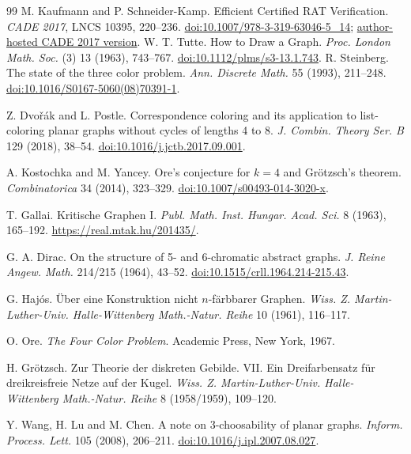 \documentclass[11pt]{article}
\begin{document}
\begin{thebibliography}{99}
M. Kaufmann and P. Schneider-Kamp.
Efficient Certified RAT Verification.
\emph{CADE 2017}, LNCS 10395, 220--236.
\href{https://doi.org/10.1007/978-3-319-63046-5_14}{doi:10.1007/978-3-319-63046-5\_14};
\href{https://www.cs.cmu.edu/~mheule/publications/lrat.pdf}{author-hosted CADE 2017 version}.
 W. T. Tutte. How to Draw a Graph.
\emph{Proc. London Math. Soc.} (3) 13 (1963), 743--767.
\href{https://doi.org/10.1112/plms/s3-13.1.743}{doi:10.1112/plms/s3-13.1.743}.
 R. Steinberg.
The state of the three color problem.
\emph{Ann. Discrete Math.} 55 (1993), 211--248.
\href{https://doi.org/10.1016/S0167-5060(08)70391-1}{doi:10.1016/S0167-5060(08)70391-1}.

 Z. Dvo\v{r}\'ak and L. Postle.
Correspondence coloring and its application to list-coloring planar graphs
without cycles of lengths 4 to 8.
\emph{J. Combin. Theory Ser. B} 129 (2018), 38--54.
\href{https://doi.org/10.1016/j.jctb.2017.09.001}{doi:10.1016/j.jctb.2017.09.001}.

 A. Kostochka and M. Yancey.
Ore's conjecture for $k=4$ and Gr\"otzsch's theorem.
\emph{Combinatorica} 34 (2014), 323--329.
\href{https://doi.org/10.1007/s00493-014-3020-x}{doi:10.1007/s00493-014-3020-x}.

 T. Gallai. Kritische Graphen I.
\emph{Publ. Math. Inst. Hungar. Acad. Sci.} 8 (1963), 165--192.
\url{https://real.mtak.hu/201435/}.

 G. A. Dirac.
On the structure of 5- and 6-chromatic abstract graphs.
\emph{J. Reine Angew. Math.} 214/215 (1964), 43--52.
\href{https://doi.org/10.1515/crll.1964.214-215.43}{doi:10.1515/crll.1964.214-215.43}.

 G. Haj\'os.
\"Uber eine Konstruktion nicht $n$-f\"arbbarer Graphen.
\emph{Wiss. Z. Martin-Luther-Univ. Halle-Wittenberg Math.-Natur. Reihe}
10 (1961), 116--117.

 O. Ore.
\emph{The Four Color Problem}. Academic Press, New York, 1967.

 H. Gr\"otzsch.
Zur Theorie der diskreten Gebilde. VII. Ein Dreifarbensatz f\"ur
dreikreisfreie Netze auf der Kugel.
\emph{Wiss. Z. Martin-Luther-Univ. Halle-Wittenberg Math.-Natur. Reihe}
8 (1958/1959), 109--120.

 Y. Wang, H. Lu and M. Chen.
A note on 3-choosability of planar graphs.
\emph{Inform. Process. Lett.} 105 (2008), 206--211.
\href{https://doi.org/10.1016/j.ipl.2007.08.027}{doi:10.1016/j.ipl.2007.08.027}.


\end{thebibliography}
\end{document}
